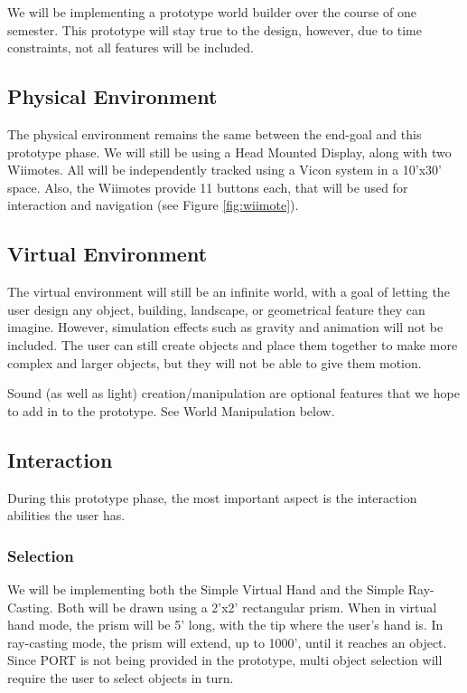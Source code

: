We will be implementing a prototype world builder over the course of one semester.
This prototype will stay true to the design, however, due to time constraints, not all features will be included.

\subsection{Physical Environment}
The physical environment remains the same between the end-goal and this prototype phase.
We will still be using a Head Mounted Display, along with two Wiimotes.
All will be independently tracked using a Vicon system in a 10'x30' space.
Also, the Wiimotes provide 11 buttons each, that will be used for interaction and navigation (see Figure \ref{fig:wiimote}).

\subsection{Virtual Environment}
The virtual environment will still be an infinite world, with a goal of letting the user design any object, building, landscape, or geometrical feature they can imagine.
However, simulation effects such as gravity and animation will not be included.
The user can still create objects and place them together to make more complex and larger objects, but they will not be able to give them motion.

Sound (as well as light) creation/manipulation are optional features that we hope to add in to the prototype.  See World Manipulation below.

\subsection{Interaction}
During this prototype phase, the most important aspect is the interaction abilities the user has.

\subsubsection{Selection}
We will be implementing both the Simple Virtual Hand and the Simple Ray-Casting.
Both will be drawn using a 2'x2' rectangular prism.
When in virtual hand mode, the prism will be 5' long, with the tip where the user's hand is.
In ray-casting mode, the prism will extend, up to 1000', until it reaches an object.
Since PORT is not being provided in the prototype, multi object selection will require the user to select objects in turn.

